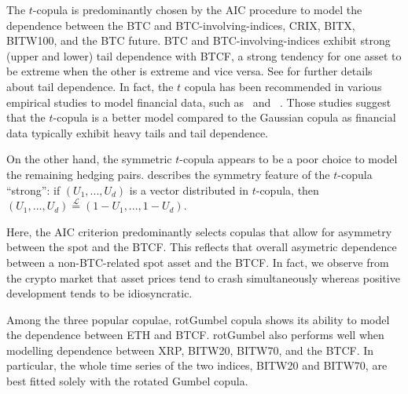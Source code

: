 The $t$-copula is predominantly chosen by the AIC procedure to model the dependence between 
the BTC and BTC-involving-indices, CRIX, BITX, BITW100, and the BTC
future.
BTC and BTC-involving-indices exhibit strong (upper and lower) tail
dependence with BTCF, a strong tendency for one asset to be extreme when the other is extreme and
vice versa. 
See \cite{McNeil2015} for further details about tail dependence.
In fact, the $t$ copula has been recommended in various empirical
studies to model financial data, such as~\cite{zeevi2002beyond} and~
\cite{breymann2003dependence}.
Those studies suggest that the $t$-copula is a better model compared
to the Gaussian copula as financial data typically exhibit heavy tails
and tail dependence. 

On the other hand, the symmetric $t$-copula appears to be 
a poor choice to model the remaining hedging pairs. 
\cite{demarta2005t} describes the symmetry feature of the $t$-copula ``strong'':
if $(U_1, ..., U_d)$ is a vector distributed in $t$-copula,
then $(U_1, ..., U_d) \overset{\mathcal{L}}= (1-U_1, ...,1-U_d)$.

Here, the AIC criterion predominantly selects copulas that allow for asymmetry between the spot
and the BTCF.
This reflects that overall asymetric dependence between a non-BTC-related spot asset and
the BTCF.
In fact, we observe from the crypto market that asset prices tend to crash simultaneously whereas positive development
tends to be idiosyncratic.   



Among the three popular copulae, rotGumbel copula shows its ability to
model the dependence between ETH and BTCF. rotGumbel also performs
well when modelling dependence between XRP, BITW20, BITW70, and the
BTCF. In particular, the whole time series of the two indices, BITW20
and BITW70, are best fitted solely with the rotated Gumbel
copula.

